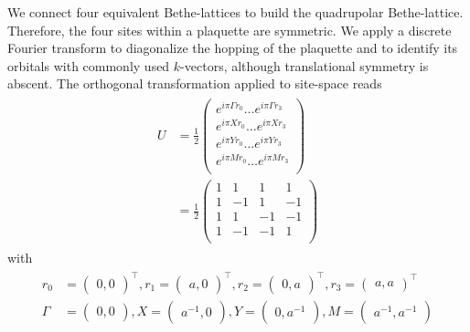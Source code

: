 \documentclass[aps,prb,twocolumn,groupedaddress,amsmath,amssymb]{revtex4-1}
\begin{document}
We connect four equivalent Bethe-lattices to build the quadrupolar Bethe-lattice. Therefore, the four sites within a plaquette are symmetric. We apply a discrete Fourier transform to diagonalize the hopping of the plaquette and to identify its orbitals with commonly used $k$-vectors, although translational symmetry is abscent. The orthogonal transformation applied to site-space reads
\begin{align}
  \label{eq:ktransform}
  \begin{split}
    U&=\frac{1}{2}
    \begin{pmatrix}
      e^{i\pi\Gamma r_0}\ldots e^{i\pi\Gamma r_3}\\
      e^{i\pi X r_0}\ldots e^{i\pi X r_3}\\
      e^{i\pi Y r_0}\ldots e^{i\pi Y r_3}\\
      e^{i\pi M r_0}\ldots e^{i\pi M r_3}\\
    \end{pmatrix}\\
    &=\frac{1}{2}
    \begin{pmatrix}
      1&1&1&1\\
      1&-1&1&-1\\
      1&1&-1&-1\\
      1&-1&-1&1\\
    \end{pmatrix}
  \end{split}
\end{align}
with
\begin{align}
  \label{eq:ktransform2}
  \begin{split}
    r_0&=\begin{pmatrix}0,0\end{pmatrix}^\intercal,r_1=\begin{pmatrix}a,0\end{pmatrix}^\intercal, r_2=\begin{pmatrix}0,a\end{pmatrix}^\intercal,r_3=\begin{pmatrix}a,a\end{pmatrix}^\intercal\\
    \Gamma&=\begin{pmatrix}0,0\end{pmatrix},X=\begin{pmatrix}a^{-1},0\end{pmatrix},Y=\begin{pmatrix}0,a^{-1}\end{pmatrix},M=\begin{pmatrix}a^{-1},a^{-1}\end{pmatrix}
  \end{split}
\end{align}
\end{document}
